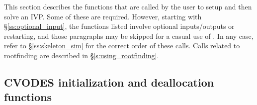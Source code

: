 This section describes the {\cvodes} functions that are called by the
user to setup and then solve an IVP. Some of these are required. However,
starting with \S\ref{ss:optional_input}, the functions listed involve
optional inputs/outputs or restarting, and those paragraphs may be
skipped for a casual use of {\cvodes}. In any case, refer to
\S\ref{ss:skeleton_sim} for the correct order of these calls.
Calls related to rootfinding are described in \S\ref{s:using_rootfinding}.

\subsection{CVODES initialization and deallocation functions}
\label{sss:cvodemalloc}

